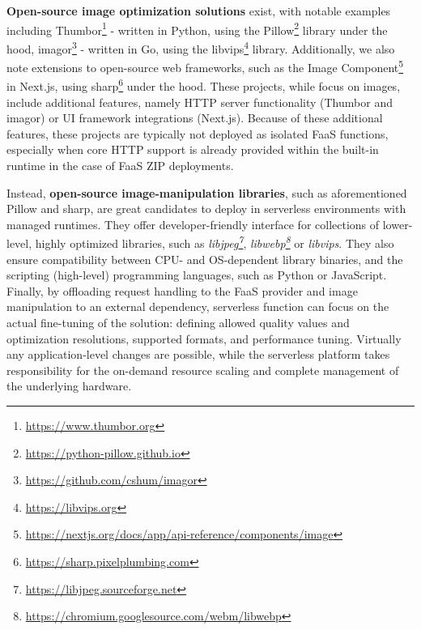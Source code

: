 \textbf{Open-source image optimization solutions} exist, with notable examples including Thumbor\footnote{\url{https://www.thumbor.org}} - written in Python, using the Pillow\footnote{\url{https://python-pillow.github.io}} library under the hood, imagor\footnote{\url{https://github.com/cshum/imagor}} - written in Go, using the libvips\footnote{\url{https://libvips.org}} library. Additionally, we also note extensions to open-source web frameworks, such as the Image Component\footnote{\url{https://nextjs.org/docs/app/api-reference/components/image}} in Next.js, using sharp\footnote{\url{https://sharp.pixelplumbing.com}} under the hood. These projects, while focus on images, include additional features, namely HTTP server functionality (Thumbor and imagor) or UI framework integrations (Next.js). Because of these additional features, these projects are typically not deployed as isolated FaaS functions, especially when core HTTP support is already provided within the built-in runtime in the case of FaaS ZIP deployments.

Instead, \textbf{open-source image-manipulation libraries}, such as aforementioned Pillow and sharp, are great candidates to deploy in serverless environments with managed runtimes. They offer developer-friendly interface for collections of lower-level, highly optimized libraries, such as \emph{libjpeg\footnote{\url{https://libjpeg.sourceforge.net}}}, \emph{libwebp\footnote{\url{https://chromium.googlesource.com/webm/libwebp}}} or \emph{libvips}. They also ensure compatibility between CPU- and OS-dependent library binaries, and the scripting (high-level) programming languages, such as Python or JavaScript. Finally, by offloading request handling to the FaaS provider and image manipulation to an external dependency, serverless function can focus on the actual fine-tuning of the solution: defining allowed quality values and optimization resolutions, supported formats, and performance tuning. Virtually any application-level changes are possible, while the serverless platform takes responsibility for the on-demand resource scaling and complete management of the underlying hardware.
